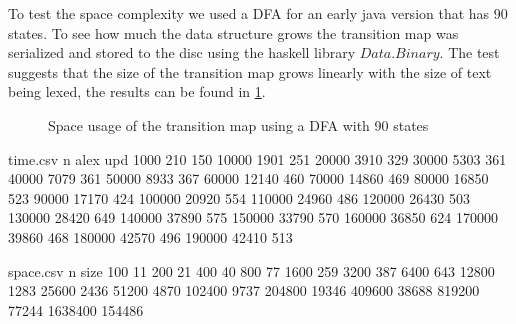 To test the space complexity we used a DFA for an early java version that has
90 states. To see how much the data structure grows the transition map was
serialized and stored to the disc using the haskell library $Data.Binary$. The
test suggests that the size of the transition map grows linearly with the size
of text being lexed, the results can be found in \cref{fig:IncSpace}.

\begin{figure}[!htp]
\caption{Space usage of the transition map using a DFA with 90 states\label{fig:IncSpace}}
\end{figure}

\begin{filecontents*}{time.csv}
n      alex   upd
1000   210    150
10000  1901   251
20000  3910   329
30000  5303   361
40000  7079   361
50000  8933   367
60000  12140  460
70000  14860  469
80000  16850  523
90000  17170  424
100000 20920  554
110000 24960  486
120000 26430  503
130000 28420  649
140000 37890  575
150000 33790  570
160000 36850  624
170000 39860  468
180000 42570  496
190000 42410  513
\end{filecontents*}

\begin{filecontents*}{space.csv}
n       size
100     11
200     21
400     40
800     77
1600    259
3200    387
6400    643
12800   1283
25600   2436
51200   4870
102400  9737
204800  19346
409600  38688
819200  77244
1638400 154486
\end{filecontents*}
